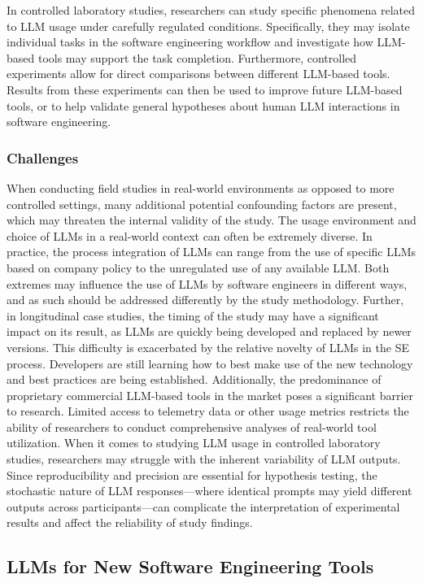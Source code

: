 In controlled laboratory studies, researchers can study specific phenomena related to LLM usage under carefully regulated conditions.
Specifically, they may isolate individual tasks in the software engineering workflow and investigate how LLM-based tools may support the task completion.
Furthermore, controlled experiments allow for direct comparisons between different LLM-based tools.
Results from these experiments can then be used to improve future LLM-based tools, or to help validate general hypotheses about human LLM interactions in software engineering.

\subsubsection{Challenges}

When conducting field studies in real-world environments as opposed to more controlled settings, many additional potential confounding factors are present, which may threaten the internal validity of the study.
The usage environment and choice of LLMs in a real-world context can often be extremely diverse.
In practice, the process integration of LLMs can range from the use of specific LLMs based on company policy to the unregulated use of any available LLM. 
Both extremes may influence the use of LLMs by software engineers in different ways, and as such should be addressed differently by the study methodology.
Further, in longitudinal case studies, the timing of the study may have a significant impact on its result, as LLMs are quickly being developed and replaced by newer versions.
This difficulty is exacerbated by the relative novelty of LLMs in the SE process.
Developers are still learning how to best make use of the new technology and best practices are being established.
Additionally, the predominance of proprietary commercial LLM-based tools in the market poses a significant barrier to research.
Limited access to telemetry data or other usage metrics restricts the ability of researchers to conduct comprehensive analyses of real-world tool utilization.
When it comes to studying LLM usage in controlled laboratory studies, researchers may struggle with the inherent variability of LLM outputs.
Since reproducibility and precision are essential for hypothesis testing, the stochastic nature of LLM responses---where identical prompts may yield different outputs across participants---can complicate the interpretation of experimental results and affect the reliability of study findings.

\subsection{LLMs for New Software Engineering Tools}

